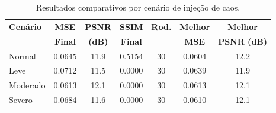 \begin{table}[htbp]
\centering
\caption{Resultados comparativos por cenário de injeção de caos.}
\label{tab:chaos_results}
\small
\begin{tabular}{lcccccc}
\hline
\textbf{Cenário} & \textbf{MSE} & \textbf{PSNR} & \textbf{SSIM} & \textbf{Rod.} & \textbf{Melhor} & \textbf{Melhor} \\
 & \textbf{Final} & \textbf{(dB)} & \textbf{Final} & & \textbf{MSE} & \textbf{PSNR (dB)} \\
\hline
Normal & 0.0645 & 11.9 & 0.5154 & 30 & 0.0604 & 12.2 \\
Leve & 0.0712 & 11.5 & 0.0000 & 30 & 0.0639 & 11.9 \\
Moderado & 0.0613 & 12.1 & 0.0000 & 30 & 0.0613 & 12.1 \\
Severo & 0.0684 & 11.6 & 0.0000 & 30 & 0.0610 & 12.1 \\
\hline
\end{tabular}
\end{table}
